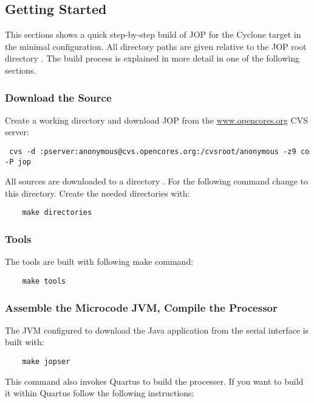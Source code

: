 \subsection{Getting Started}

This sections shows a quick step-by-step build of JOP for the
Cyclone target in the minimal configuration. All directory paths are
given relative to the JOP root directory . The build
process is explained in more detail in one of the following
sections.

\subsubsection{Download the Source}

Create a working directory and download JOP from the
\url{www.opencores.org} CVS server:

\begin{verbatim}
 cvs -d :pserver:anonymous@cvs.opencores.org:/cvsroot/anonymous -z9 co -P jop
\end{verbatim}

All sources are downloaded to a directory . For the
following command change to this directory. Create the needed
directories with:
\begin{verbatim}
    make directories
\end{verbatim}

\subsubsection{Tools}

The tools are built with following make command:

\begin{verbatim}
    make tools
\end{verbatim}

\subsubsection{Assemble the Microcode JVM, Compile the Processor}

The JVM configured to download the Java application from the serial
interface is built with:

\begin{verbatim}
    make jopser
\end{verbatim}

This command also invokes Quartus to build the processer. If you
want to build it within Quartus follow the following instructions:

